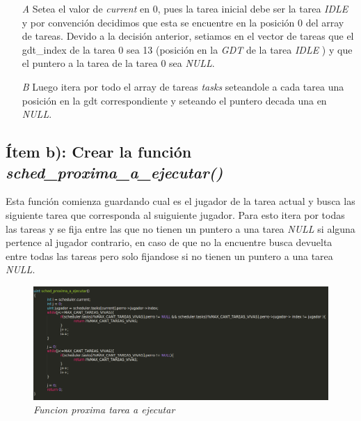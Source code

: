 \begin{itemize}

\item [\textit{A}] Setea el valor de \textit{current} en 0, pues la tarea inicial debe ser la tarea \textit{IDLE} y por convención decidimos que esta se encuentre en la posición 0 del array de tareas. Devido a la decisión anterior, setiamos en el vector de tareas que el gdt\_index de la tarea 0 sea 13 (posición en la \textit{GDT} de la tarea \textit{IDLE} ) y que el puntero a la tarea de la tarea 0 sea \textit{NULL}.

\item [\textit{B}] Luego itera por todo el array de tareas \textit{tasks} seteandole a cada tarea una posición en la gdt correspondiente y seteando el puntero decada una en \textit{NULL}.

\end{itemize}

\subsection{Ítem b):  Crear la función  \textit{sched\_proxima\_a\_ejecutar()}}

Esta función comienza guardando cual es el jugador de la tarea actual y busca las siguiente tarea que corresponda al suiguiente jugador. Para esto itera por todas las tareas y se fija entre las que no tienen un puntero a una tarea \textit{NULL} si alguna pertence al jugador contrario, en caso de que no la encuentre busca devuelta entre todas las tareas pero solo fijandose si no tienen un puntero a una tarea  \textit{NULL}.

\begin{figure}[H]
\begin{center}
  \includegraphics[width=\linewidth]{ejercicio7/proxeje.png}
  \caption{{\small \textit{Funcion proxima tarea a ejecutar }}}
\endminipage
\end{center}
\end{figure}

